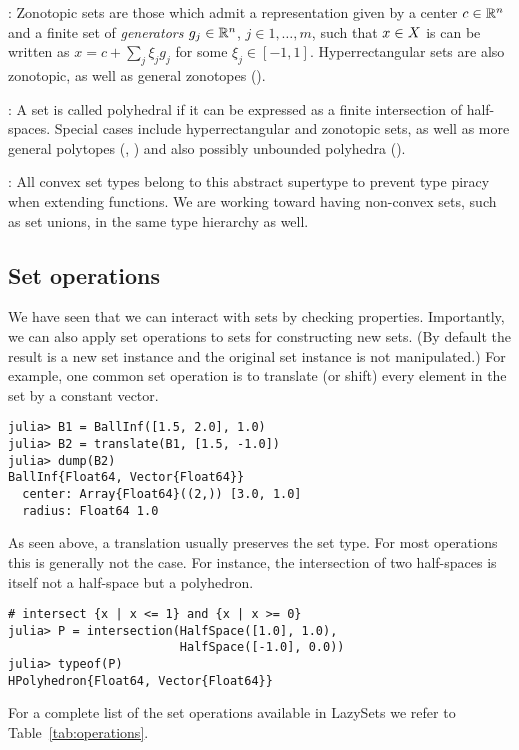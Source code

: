 \smallskip

: Zonotopic sets are those which admit a representation given by a center $c \in \mathbb{R}^n$ and a finite set of \emph{generators} $g_j \in \mathbb{R}^n$, $j \in 1, \ldots, m$, such that $x \in X$ is can be written as $x = c + \sum_j \xi_j g_j$ for some $\xi_j \in [-1, 1]$. Hyperrectangular sets are also zonotopic, as well as general zonotopes ().

\smallskip

: A set is called polyhedral if it can be expressed as a finite intersection of half-spaces. Special cases include hyperrectangular and zonotopic sets, as well as more general polytopes (, ) and also possibly unbounded polyhedra ().

\smallskip

: All convex set types belong to this abstract supertype to prevent type piracy when extending  functions.
We are working toward having non-convex sets, such as set unions, in the same type hierarchy as well.


\subsection{Set operations}

We have seen that we can interact with sets by checking properties.
Importantly, we can also apply set operations to sets for constructing new sets.
(By default the result is a new set instance and the original set instance is not manipulated.)
For example, one common set operation is to translate (or shift) every element in the set by a constant vector.

\begin{minipage}{\linewidth}
\begin{lstlisting}
julia> B1 = BallInf([1.5, 2.0], 1.0)
julia> B2 = translate(B1, [1.5, -1.0])
julia> dump(B2)
BallInf{Float64, Vector{Float64}}
  center: Array{Float64}((2,)) [3.0, 1.0]
  radius: Float64 1.0
\end{lstlisting}
\end{minipage}

As seen above, a translation usually preserves the set type.
For most operations this is generally not the case.
For instance, the intersection of two half-spaces is itself not a half-space but a polyhedron.

\begin{minipage}{\linewidth}
\begin{lstlisting}
# intersect {x | x <= 1} and {x | x >= 0}
julia> P = intersection(HalfSpace([1.0], 1.0),
                        HalfSpace([-1.0], 0.0))
julia> typeof(P)
HPolyhedron{Float64, Vector{Float64}}
\end{lstlisting}
\end{minipage}

For a complete list of the set operations available in LazySets we refer to Table~\ref{tab:operations}.

